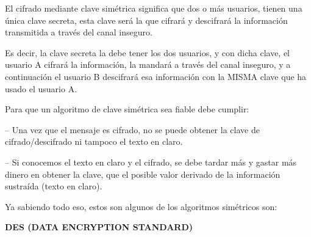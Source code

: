 \documentclass[12pt]{article}
\begin{document}
\vspace{\baselineskip}
\begin{justify}
El cifrado mediante clave simétrica significa que dos o más usuarios, tienen una única clave secreta, esta clave será la que cifrará y descifrará la información transmitida a través del canal inseguro.\textbf{ }
\end{justify}\par


\vspace{\baselineskip}
\begin{justify}
Es decir, la clave secreta la debe tener los dos usuarios, y con dicha clave, el usuario A cifrará la información, la mandará a través del canal inseguro, y a continuación el usuario B descifrará esa información con la MISMA clave que ha usado el usuario A.
\end{justify}\par


\vspace{\baselineskip}
\begin{justify}
Para que un algoritmo de clave simétrica sea fiable debe cumplir:
\end{justify}\par


\vspace{\baselineskip}
\begin{justify}
– Una vez que el mensaje es cifrado, no se puede obtener la clave de cifrado/descifrado ni tampoco el texto en claro.
\end{justify}\par

\begin{justify}
– Si conocemos el texto en claro y el cifrado, se debe tardar más y gastar más dinero en obtener la clave, que el posible valor derivado de la información sustraída (texto en claro).
\end{justify}\par


\vspace{\baselineskip}
\begin{justify}
Ya sabiendo todo eso, estos son algunos de los algoritmos simétricos son:
\end{justify}\par


\vspace{\baselineskip}
\begin{justify}
\textbf{DES (DATA ENCRYPTION STANDARD)} 
\end{justify}\par
\end{document}
